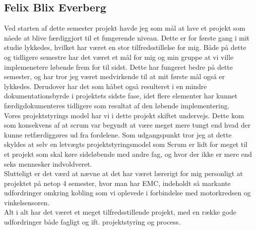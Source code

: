 \subsection*{Felix Blix Everberg}
Ved starten af dette semester projekt havde jeg som mål at lave et projekt som nåede at blive færdiggjort til et fungerende niveau. Dette er for første gang i mit studie lykkedes, hvilket har været en stor tilfredsstillelse for mig. Både på dette og tidligere semestre har det været et mål for mig og min gruppe at vi ville implemenetere løbende frem for til sidst. Dette har fungeret bedre på dette semester, og har tror jeg været medvirkende til at mit første mål også er lykkedes. Derudover har det som håbet også resulteret i en mindre dokumentationsbyrde i projektets sidste fase, idet flere elementer har kunnet færdigdokumenteres tidligere som resultat af den løbende implementering. \\
Vores projektstyrings model har vi i dette projekt skiftet undervejs. Dette kom som konsekvens af at scrum var begyndt at være meget mere tungt end hvad der kunne retfærdiggøres ud fra fordelene. Som udgangspunkt tror jeg at dette skyldes at selv en letvægts projektstyringsmodel som Scrum er lidt for meget til et projekt som skal køre sideløbende med andre fag, og hvor der ikke er mere end seks mennesker indvoldveret. \\
Slutteligt er det værd at nævne at det har været lærerigt for mig personligt at projektet på netop 4 semester, hvor man har EMC, indeholdt så markante udfordringer omkring kobling som vi oplevede i forbindelse med motorkredsen og vinkelsensoren. \\
Alt i alt har det været et meget tilfredsstillende projekt, med en række gode udfordringer både fagligt og ift. projektstyring og process.\\